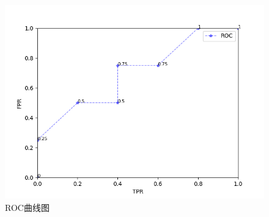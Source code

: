 \documentclass[a4paper,UTF8]{article}
\numberwithin{equation}{section}
\theoremstyle{definition}
\begin{document}
\begin{figure}[H]
	\centering%
	\includegraphics[width=1\textwidth]{myplot.png}
	\caption{ROC曲线图}
\end{figure}
\end{document}

